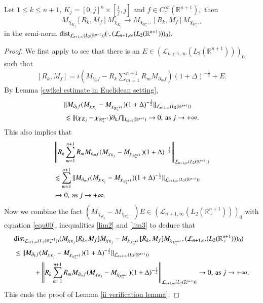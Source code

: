 \documentclass[12pt]{amsart}
\begin{document}
\begin{lemma}\label{ii verification lemma} Let $1\leq k\leq n+1$, $K_j=[0,j]^n\times[\frac1j,j]$ and $f\in C^{\infty}_c(\mathbb{R}^{n+1}),$ then
$$M_{\chi_{K_j}}[R_k,M_f]M_{\chi_{K_j}}\to M_{\chi_{\mathbb{R}^{n+1}_+}}[R_k,M_f]M_{\chi_{\mathbb{R}^{n+1}_+}}$$
in the semi-norm ${\rm dist}_{\mathcal{L}_{n+1,\infty}(L_2(\mathbb{R}^{n+1}))}(\cdot,(\mathcal{L}_{n+1,\infty}(L_2(\mathbb{R}^{n+1})))_0).$
\end{lemma}
\begin{proof}
We first apply \cite[Theorem 6.3.1]{MR4604115} to see that there is an $E\in (\mathcal{L}_{n+1,\infty}(L_2(\mathbb{R}^{n+1})))_0$ such that
\begin{align}\label{equ00}
[R_k,M_f]=i\left(M_{\partial_k f}-R_k\sum_{m=1}^{n+1}R_mM_{\partial_m f}\right)(1+\Delta)^{-\frac12}+E.
\end{align}
By Lemma \ref{cwikel estimate in Euclidean setting},
\begin{align}\label{lim2}
&\|M_{\partial_k f}(M_{\chi_{K_j}}-M_{\chi_{\mathbb{R}_+^{n+1}}})(1+\Delta)^{-\frac{1}{2}}\|_{\mathcal{L}_{n+1,\infty}(L_2(\mathbb{R}^{n+1}))}\nonumber\\
&\lesssim \|(\chi_{K_j}-\chi_{\mathbb{R}_+^{n+1}})\partial_k f\|_{L_{n+1}(\mathbb{R}^{n+1})}\rightarrow 0,\, {\rm as}\ j\rightarrow+\infty.
\end{align}
This also implies that
\begin{align}\label{lim3}
&\left\|R_k\sum_{m=1}^{n+1}R_mM_{\partial_m f}(M_{\chi_{K_j}}-M_{\chi_{\mathbb{R}_+^{n+1}}})(1+\Delta)^{-\frac{1}{2}}\right\|_{\mathcal{L}_{n+1,\infty}(L_2(\mathbb{R}^{n+1}))}\nonumber\\
&\lesssim \sum_{m=1}^{n+1} \|M_{\partial_m f}(M_{\chi_{K_j}}-M_{\chi_{\mathbb{R}_+^{n+1}}})(1+\Delta)^{-\frac{1}{2}}\|_{\mathcal{L}_{n+1,\infty}(L_2(\mathbb{R}^{n+1}))}\nonumber\\
&\rightarrow 0,\, {\rm as}\ j\rightarrow +\infty.
\end{align}
Now we combine the fact $(M_{\chi_{K_j}}-M_{\chi_{\mathbb{R}_+^{n+1}}})E\in (\mathcal{L}_{n+1,\infty}(L_2(\mathbb{R}^{n+1}_+)))_0$ with equation \eqref{equ00}, inequalities \eqref{lim2} and \eqref{lim3}  to deduce that
\begin{align*}
&{\rm dist}_{\mathcal{L}_{n+1,\infty}(L_2(\mathbb{R}^{n+1}_+))}(M_{\chi_{K_j}}[R_k,M_f]M_{\chi_{K_j}}-M_{\chi_{\mathbb{R}^{n+1}_+}}[R_k,M_f]M_{\chi_{\mathbb{R}^{n+1}_+}},(\mathcal{L}_{n+1,\infty}(L_2(\mathbb{R}^{n+1}_+)))_0)\\
&\leq \|M_{\partial_k f}(M_{\chi_{K_j}}-M_{\chi_{\mathbb{R}_+^{n+1}}})(1+\Delta)^{-\frac{1}{2}}\|_{\mathcal{L}_{n+1,\infty}(L_2(\mathbb{R}^{n+1}))}\\
&\hspace{1.0cm}+\left\|R_k\sum_{m=1}^{n+1}R_mM_{\partial_m f}(M_{\chi_{K_j}}-M_{\chi_{\mathbb{R}_+^{n+1}}})(1+\Delta)^{-\frac{1}{2}}\right\|_{\mathcal{L}_{n+1,\infty}(L_2(\mathbb{R}^{n+1}))}\to 0,\, {\rm as}\ j\rightarrow+\infty.
\end{align*}
This ends the proof of Lemma \ref{ii verification lemma}.
\end{proof}
\end{document}
